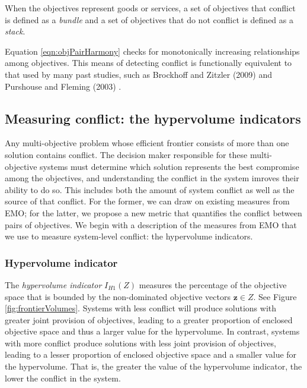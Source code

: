 When the objectives represent goods or services, a set of objectives that conflict is defined as a \textit{bundle} and a set of objectives that do not conflict is defined as a \textit{stack}.

Equation \eqref{eqn:objPairHarmony} checks for monotonically increasing relationships among objectives. This means of detecting conflict is functionally equivalent to that used by many past studies, such as Brockhoff and Zitzler (2009) \cite{brockhoff2009objective} and Purshouse and Fleming (2003) \cite{purshouse2003conflict}.

\subsection{Measuring conflict: the hypervolume indicators}
\label{sec:waysToMeasureFrontiers}
Any multi-objective problem whose efficient frontier consists of more than one solution contains conflict. The decision maker responsible for these multi-objective systems must determine which solution represents the best compromise among the objectives, and understanding the conflict in the system imroves their ability to do so. This includes both the amount of system conflict as well as the source of that conflict. For the former, we can draw on existing measures from EMO; for the latter, we propose a new metric that quantifies the conflict between pairs of objectives. We begin with a description of the measures from EMO that we use to measure system-level conflict: the hypervolume indicators.

\subsubsection{Hypervolume indicator}
The \textit{hypervolume indicator} $I_{H1}(Z)$ measures the percentage of the objective space that is bounded by the non-dominated objective vectors $\mathbf{z} \in Z$. See Figure \ref{fig:frontierVolumes}. Systems with less conflict will produce solutions with greater joint provision of objectives, leading to a greater proportion of enclosed objective space and thus a larger value for the hypervolume. In contrast, systems with more conflict produce solutions with less joint provision of objectives, leading to a lesser proportion of enclosed objective space and a smaller value for the hypervolume. That is, the greater the value of the hypervolume indicator, the lower the conflict in the system.

